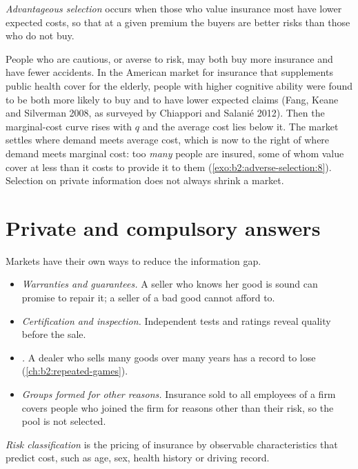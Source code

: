 \begin{definition}\label{def:b2:adverse-selection:advantageous}
\emph{Advantageous selection} occurs when those who value insurance most have lower
expected costs, so that at a given premium the buyers are better risks than those who do not buy.
\end{definition}

People who are cautious, or averse to risk, may both buy more insurance and have fewer accidents. In the American market
for insurance that supplements public health cover for the elderly, people with higher cognitive ability were found to be
both more likely to buy and to have lower expected claims (Fang, Keane and Silverman 2008, as surveyed by Chiappori and
Salani\'e 2012). Then the marginal-cost curve rises with $q$ and the average cost lies below it. The market settles where
demand meets average cost, which is now to the right of where demand meets marginal cost: too \emph{many} people are
insured, some of whom value cover at less than it costs to provide it to them (\cref{exo:b2:adverse-selection:8}).
Selection on private information does not always shrink a market.

\section{Private and compulsory answers}\label{sec:b2:adverse-selection:answers}

Markets have their own ways to reduce the information gap.
\begin{itemize}
  \item \emph{Warranties and guarantees.} A seller who knows her good is sound can promise to repair it; a seller of a bad
    good cannot afford to.
  \item \emph{Certification and inspection.} Independent tests and ratings reveal quality before the sale.
  \item \emph{.} A dealer who sells many goods over many years has a record to lose (\cref{ch:b2:repeated-games}).
  \item \emph{Groups formed for other reasons.} Insurance sold to all employees of a firm covers people who joined the firm
    for reasons other than their risk, so the pool is not selected.
\end{itemize}

\begin{definition}\label{def:b2:adverse-selection:risk-classification}
\emph{Risk classification} is the pricing of insurance by observable characteristics that
predict cost, such as age, sex, health history or driving record.
\end{definition}

